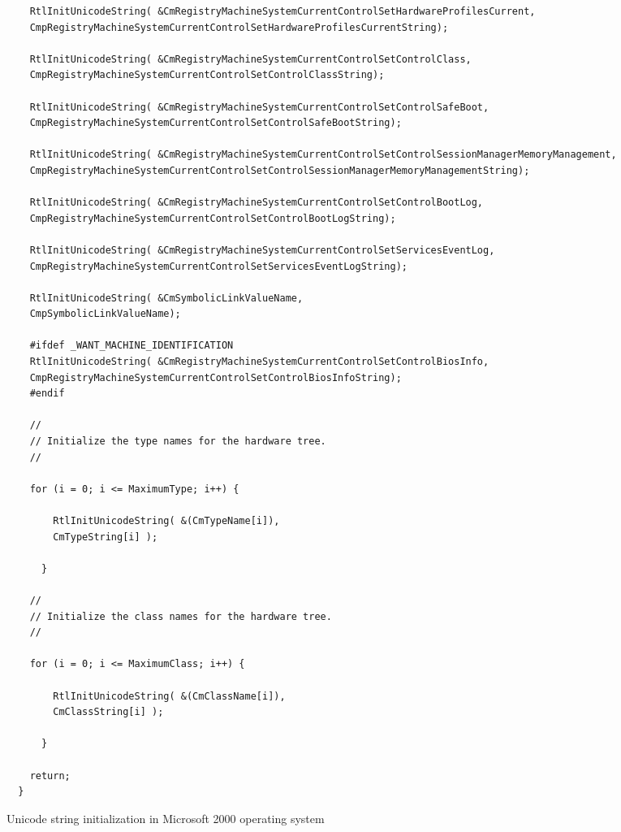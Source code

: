 \begin{listing}
\begin{verbatim}
    RtlInitUnicodeString( &CmRegistryMachineSystemCurrentControlSetHardwareProfilesCurrent,
    CmpRegistryMachineSystemCurrentControlSetHardwareProfilesCurrentString);

    RtlInitUnicodeString( &CmRegistryMachineSystemCurrentControlSetControlClass,
    CmpRegistryMachineSystemCurrentControlSetControlClassString);

    RtlInitUnicodeString( &CmRegistryMachineSystemCurrentControlSetControlSafeBoot,
    CmpRegistryMachineSystemCurrentControlSetControlSafeBootString);

    RtlInitUnicodeString( &CmRegistryMachineSystemCurrentControlSetControlSessionManagerMemoryManagement,
    CmpRegistryMachineSystemCurrentControlSetControlSessionManagerMemoryManagementString);

    RtlInitUnicodeString( &CmRegistryMachineSystemCurrentControlSetControlBootLog,
    CmpRegistryMachineSystemCurrentControlSetControlBootLogString);

    RtlInitUnicodeString( &CmRegistryMachineSystemCurrentControlSetServicesEventLog,
    CmpRegistryMachineSystemCurrentControlSetServicesEventLogString);

    RtlInitUnicodeString( &CmSymbolicLinkValueName,
    CmpSymbolicLinkValueName);

    #ifdef _WANT_MACHINE_IDENTIFICATION
    RtlInitUnicodeString( &CmRegistryMachineSystemCurrentControlSetControlBiosInfo,
    CmpRegistryMachineSystemCurrentControlSetControlBiosInfoString);
    #endif

    //
    // Initialize the type names for the hardware tree.
    //

    for (i = 0; i <= MaximumType; i++) {

        RtlInitUnicodeString( &(CmTypeName[i]),
        CmTypeString[i] );

      }

    //
    // Initialize the class names for the hardware tree.
    //

    for (i = 0; i <= MaximumClass; i++) {

        RtlInitUnicodeString( &(CmClassName[i]),
        CmClassString[i] );

      }

    return;
  }
  \end{verbatim}
  \caption{Unicode string initialization in Microsoft 2000 operating system}
  \label{code:ms2000}
\end{listing}

